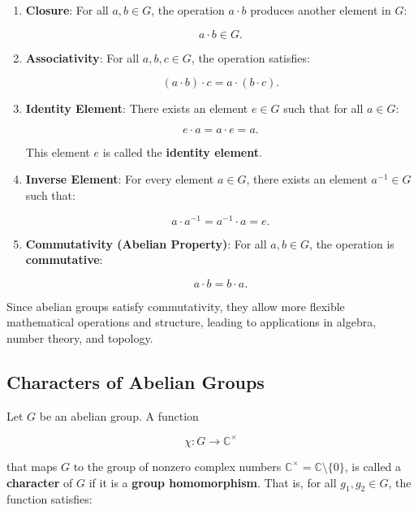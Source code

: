 \documentclass[11pt]{article}
\theoremstyle{definition}
\begin{document}
\begin{enumerate}
    \item \textbf{Closure}:  
    For all \( a, b \in G \), the operation \( a \cdot b \) produces another element in \( G \):

    \[
    a \cdot b \in G.
    \]

    \item \textbf{Associativity}:  
    For all \( a, b, c \in G \), the operation satisfies:

    \[
    (a \cdot b) \cdot c = a \cdot (b \cdot c).
    \]

    \item \textbf{Identity Element}:  
    There exists an element \( e \in G \) such that for all \( a \in G \):

    \[
    e \cdot a = a \cdot e = a.
    \]

    This element \( e \) is called the \textbf{identity element}.

    \item \textbf{Inverse Element}:  
    For every element \( a \in G \), there exists an element \( a^{-1} \in G \) such that:

    \[
    a \cdot a^{-1} = a^{-1} \cdot a = e.
    \]

    \item \textbf{Commutativity (Abelian Property)}:  
    For all \( a, b \in G \), the operation is \textbf{commutative}:

    \[
    a \cdot b = b \cdot a.
    \]

\end{enumerate}

Since abelian groups satisfy commutativity, they allow more flexible mathematical operations and structure, leading to applications in algebra, number theory, and topology.



\subsection{Characters of Abelian Groups}
Let \( G \) be an abelian group. A function  

\[
\chi: G \to \mathbb{C}^{\times}
\]

that maps \( G \) to the group of nonzero complex numbers  \(\mathbb{C}^{\times} = \mathbb{C} \setminus \{0\}\), is called a \textbf{character} of \( G \) if it is a \textbf{group homomorphism}. That is, for all \( g_1, g_2 \in G \), the function satisfies:  
\end{document}
